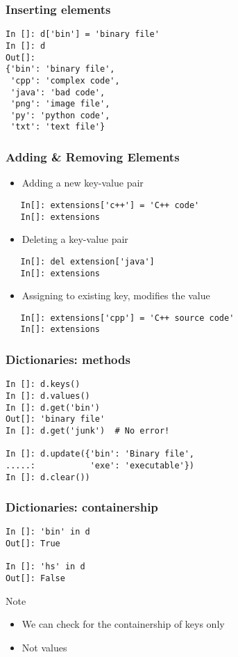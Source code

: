 \documentclass[14pt,compress]{beamer}
\begin{document}
\begin{frame}[fragile]
  \frametitle{Inserting elements}
  \begin{lstlisting}
In []: d['bin'] = 'binary file'
In []: d
Out[]:
{'bin': 'binary file',
 'cpp': 'complex code',
 'java': 'bad code',
 'png': 'image file',
 'py': 'python code',
 'txt': 'text file'}
  \end{lstlisting}
\end{frame}

\begin{frame}[fragile]
  \frametitle{Adding \& Removing Elements}
  \begin{itemize}
  \item Adding a new key-value pair
  \end{itemize}
  \begin{lstlisting}
   In[]: extensions['c++'] = 'C++ code'
   In[]: extensions
  \end{lstlisting}
  \begin{itemize}
  \item Deleting a key-value pair
  \end{itemize}
  \begin{lstlisting}
   In[]: del extension['java']
   In[]: extensions
  \end{lstlisting}
  \begin{itemize}
  \item Assigning to existing key, modifies the value
  \end{itemize}
  \begin{lstlisting}
   In[]: extensions['cpp'] = 'C++ source code'
   In[]: extensions
  \end{lstlisting}
\end{frame}

\begin{frame}[fragile]
  \frametitle{Dictionaries:  methods}
\begin{lstlisting}
In []: d.keys()
In []: d.values()
In []: d.get('bin')
Out[]: 'binary file'
In []: d.get('junk')  # No error!

In []: d.update({'bin': 'Binary file',
.....:           'exe': 'executable'})
In []: d.clear())
\end{lstlisting}
\end{frame}

\begin{frame}[fragile]
  \frametitle{Dictionaries: containership}
  \begin{lstlisting}
In []: 'bin' in d
Out[]: True

In []: 'hs' in d
Out[]: False
  \end{lstlisting}
  \begin{block}{Note}
    \begin{itemize}
      \item We can check for the containership of keys only
      \item Not values
    \end{itemize}
  \end{block}
\end{frame}
\end{document}
